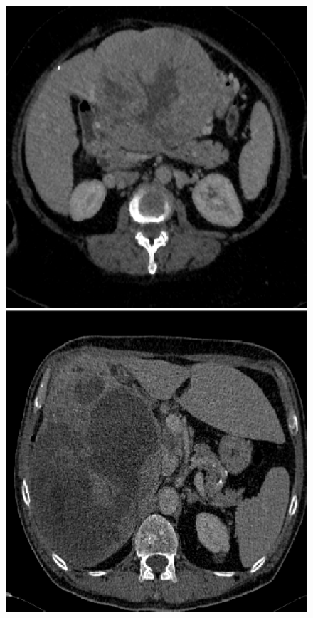 \begin{figure}[!ht]
\begin{minipage}{4cm}
\includegraphics*[width=\linewidth]{./images/2_3_raw_resized}
\end{minipage} \hspace{-0.3cm}
\begin{minipage}{4cm}
\includegraphics*[width=\linewidth]{./images/5_4_raw_resized}

\end{minipage}
\end{figure}
